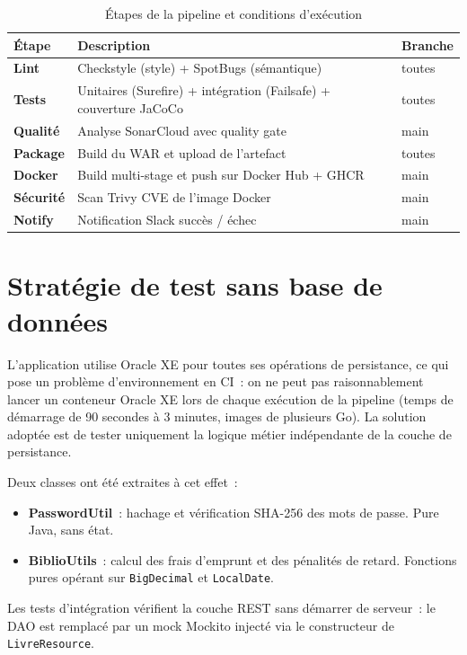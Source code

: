 \documentclass[12pt,a4paper]{report}
\begin{document}
\begin{table}[h!]
\centering
\small
\renewcommand{\arraystretch}{1.3}
\begin{tabular}{>{\bfseries}p{2.6cm} p{8.5cm} p{2cm}}
\toprule
Étape & Description & Branche \\
\midrule
Lint        & Checkstyle (style) + SpotBugs (sémantique) & toutes \\
Tests       & Unitaires (Surefire) + intégration (Failsafe) + couverture JaCoCo & toutes \\
Qualité     & Analyse SonarCloud avec quality gate & main \\
Package     & Build du WAR et upload de l'artefact & toutes \\
Docker      & Build multi-stage et push sur Docker Hub + GHCR & main \\
Sécurité    & Scan Trivy CVE de l'image Docker & main \\
Notify      & Notification Slack succès / échec & main \\
\bottomrule
\end{tabular}
\caption{Étapes de la pipeline et conditions d'exécution}
\label{tab:pipeline-stages}
\end{table}

\section{Stratégie de test sans base de données}

L'application utilise Oracle XE pour toutes ses opérations de persistance, ce
qui pose un problème d'environnement en CI~: on ne peut pas raisonnablement
lancer un conteneur Oracle XE lors de chaque exécution de la pipeline (temps
de démarrage de 90 secondes à 3 minutes, images de plusieurs Go). La solution
adoptée est de tester uniquement la logique métier indépendante de la couche
de persistance.

Deux classes ont été extraites à cet effet~:

\begin{itemize}
  \item \textbf{PasswordUtil}~: hachage et vérification SHA-256 des mots de
        passe. Pure Java, sans état.
  \item \textbf{BiblioUtils}~: calcul des frais d'emprunt et des pénalités de
        retard. Fonctions pures opérant sur \texttt{BigDecimal} et
        \texttt{LocalDate}.
\end{itemize}

Les tests d'intégration vérifient la couche REST sans démarrer de serveur~: le
DAO est remplacé par un mock Mockito injecté via le constructeur de
\texttt{LivreResource}.
\end{document}

